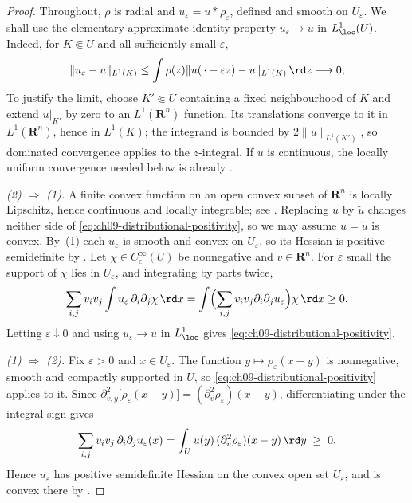 \begin{proof}
Throughout, $\rho$ is radial and $u_\varepsilon=u*\rho_\varepsilon$, defined
and smooth on $U_\varepsilon$.  We shall use the elementary approximate
identity property $u_\varepsilon\to u$ in $L^1_{\loc}(U)$.  Indeed, for
$K\Subset U$ and all sufficiently small $\varepsilon$,
\[
 \lVert u_\varepsilon-u\rVert_{L^1(K)}
 \leq \int\rho(z)
    \lVert u(\,\cdot-\varepsilon z)-u\rVert_{L^1(K)}\,\rd z
 \longrightarrow0,
\]
To justify the limit, choose $K'\Subset U$ containing a fixed neighbourhood
of $K$ and extend $u|_{K'}$ by zero to an $L^1(\mathbf R^n)$ function.  Its
translations converge to it in $L^1(\mathbf R^n)$, hence in $L^1(K)$; the
integrand is bounded by $2\lVert u\rVert_{L^1(K')}$, so dominated convergence
applies to the $z$-integral.
If $u$ is continuous, the locally uniform convergence needed below is already
.

\emph{(2) $\Rightarrow$ (1).}  A finite convex function on an open convex
subset of $\mathbf R^n$ is locally Lipschitz, hence continuous and locally
integrable; see \cite[\S10]{Roc70}.  Replacing $u$ by $\tilde u$ changes
neither side of \eqref{eq:ch09-distributional-positivity}, so we may assume
$u=\tilde u$ is convex.  By
\,(1) each $u_\varepsilon$ is smooth and
convex on $U_\varepsilon$, so its Hessian is positive semidefinite by
.  Let $\chi\in C^\infty_c(U)$ be nonnegative
and $v\in\mathbf R^n$.  For $\varepsilon$ small the support of $\chi$ lies in
$U_\varepsilon$, and integrating by parts twice,
\[
 \sum_{i,j}v_iv_j\int u_\varepsilon\,\partial_i\partial_j\chi\,\rd x
 =\int\Bigl(\sum_{i,j}v_iv_j\partial_i\partial_ju_\varepsilon\Bigr)
   \chi\,\rd x\geq0 .
\]
Letting $\varepsilon\downarrow0$ and using $u_\varepsilon\to u$ in
$L^1_{\loc}$ gives \eqref{eq:ch09-distributional-positivity}.

\emph{(1) $\Rightarrow$ (2).}  Fix $\varepsilon>0$ and $x\in U_\varepsilon$.
The function $y\mapsto\rho_\varepsilon(x-y)$ is nonnegative, smooth and
compactly supported in $U$, so \eqref{eq:ch09-distributional-positivity}
applies to it.  Since
$\partial^2_{v,y}\bigl[\rho_\varepsilon(x-y)\bigr]
=(\partial_v^2\rho_\varepsilon)(x-y)$, differentiating under the integral
sign gives
\[
 \sum_{i,j}v_iv_j\,\partial_i\partial_ju_\varepsilon(x)
 =\int_Uu(y)\,(\partial_v^2\rho_\varepsilon)(x-y)\,\rd y\;\geq\;0 .
\]
Hence $u_\varepsilon$ has positive semidefinite Hessian on the convex open
set $U_\varepsilon$, and is convex there by
.


\end{proof}
